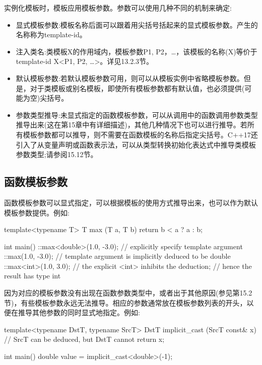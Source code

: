 
实例化模板时，模板应用模板参数。参数可以使用几种不同的机制来确定:

\begin{itemize}
\item 
显式模板参数:模板名称后面可以跟着用尖括号括起来的显式模板参数。产生的名称称为template-id。

\item 
注入类名:类模板X的作用域内，模板参数P1, P2，…，该模板的名称(X)等价于template-id X<P1, P2, …>。详见13.2.3节。

\item 
默认模板参数:若默认模板参数可用，则可以从模板实例中省略模板参数。但是，对于类模板或别名模板，即使所有模板参数都有默认值，也必须提供(可能为空)尖括号。

\item 
参数类型推导:未显式指定的函数模板参数，可以从调用中的函数调用参数类型推导出来(这在第15章中有详细描述)，其他几种情况下也可以进行推导。若所有模板参数都可以推导，则不需要在函数模板的名称后指定尖括号。C++17还引入了从变量声明或函数表示法，可以从类型转换初始化表达式中推导类模板参数类型;请参阅15.12节。
\end{itemize}

\subsection{函数模板参数}

函数模板参数可以显式指定，可以根据模板的使用方式推导出来，也可以作为默认模板参数提供。例如:

\begin{cpp}
template<typename T>
T max (T a, T b)
{
	return b < a ? a : b;
}

int main()
{
	::max<double>(1.0, -3.0); // explicitly specify template argument
	::max(1.0, -3.0); // template argument is implicitly deduced to be double
	::max<int>(1.0, 3.0); // the explicit <int> inhibits the deduction;
	// hence the result has type int
}
\end{cpp}

因为对应的模板参数没有出现在函数参数类型中，或者出于其他原因(参见第15.2节)，有些模板参数永远无法推导。相应的参数通常放在模板参数列表的开头，以便在推导其他参数的同时显式地指定。例如:

\begin{cpp}
template<typename DstT, typename SrcT>
DstT implicit_cast (SrcT const& x) // SrcT can be deduced, but DstT cannot
{
	return x;
}

int main()
{
	double value = implicit_cast<double>(-1);
}
\end{cpp}

